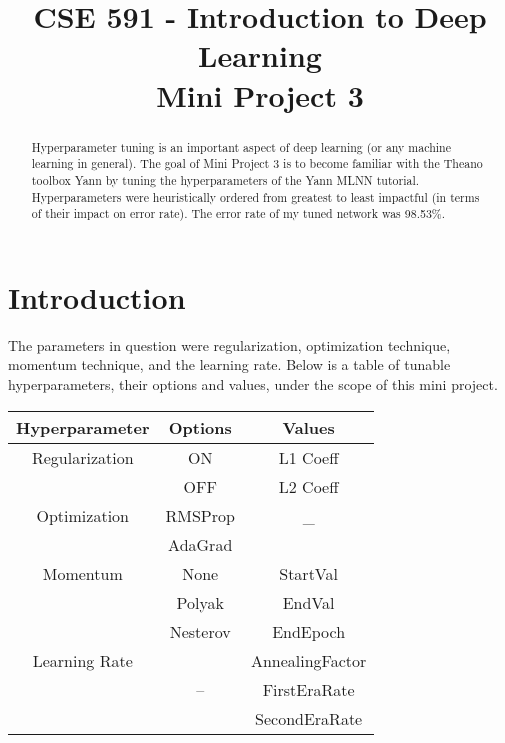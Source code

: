 \documentclass[conference,compsoc]{IEEEtran}
\begin{document}
%
\title{CSE 591 - Introduction to Deep Learning\\Mini Project 3}


\author{
}

\maketitle

\begin{abstract}
Hyperparameter tuning is an important aspect of deep learning (or any machine learning in general). The goal of Mini Project 3 is to become familiar with the Theano toolbox Yann by tuning the hyperparameters of the Yann MLNN tutorial. Hyperparameters were heuristically ordered from greatest to least impactful (in terms of their impact on error rate). The error rate of my tuned network was 98.53\%.
\end{abstract}



\IEEEpeerreviewmaketitle



\section{Introduction}
The parameters in question were regularization, optimization technique, momentum technique, and the learning rate. Below is a table of tunable hyperparameters, their options and values, under the scope of this mini project. 

\renewcommand{\arraystretch}{1.1}
\begin{center}
  \begin{tabular}{ | c | c  | c | }
    \hline
    \textbf{Hyperparameter} & \textbf{Options} & \textbf{Values} \\ \hline
    Regularization & ON & L1 Coeff \\  & OFF & L2 Coeff \\ \hline
    Optimization & RMSProp & \_ \\ & AdaGrad & \\ \hline
    Momentum &  None & StartVal \\ &  Polyak &  EndVal \\ & Nesterov &  EndEpoch \\ \hline
    Learning Rate &   & AnnealingFactor \\ & -- &  FirstEraRate \\ & &  SecondEraRate \\ \hline
  \end{tabular}
\end{center}
\end{document}
